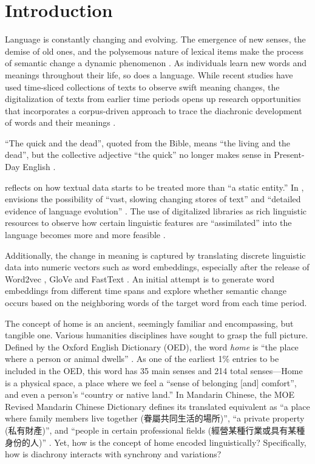 

\chapter{Introduction}
Language is constantly changing and evolving. The emergence of new senses, the demise of old ones, and the polysemous nature of lexical items make the process of semantic change a dynamic phenomenon \parencite{robertinvanhove2008}. As individuals learn new words and meanings throughout their life, so does a language. While recent studies have used time-sliced collections of texts to observe swift meaning changes, the digitalization of texts from earlier time periods opens up research opportunities that incorporates a corpus-driven approach to trace the diachronic development of words and their meanings \parencite{kutuzov2018survey,tahmasebi2018survey,camacho2018survey}.

``The quick and the dead'', quoted from the Bible, means ``the living and the dead'', but the collective adjective ``the quick'' no longer makes sense in Present-Day English \parencite[199]{semanticincrowley2010}.

\textcite{renouf2002time} reflects on how textual data starts to be treated more than ``a static entity.'' In \cite*{sinclair1982reflections}, \citeauthor{sinclair1982reflections} envisions the possibility of ``vast, slowing changing stores of text'' and ``detailed evidence of language evolution'' . The use of digitalized libraries as rich linguistic resources to observe how certain linguistic features are ``assimilated'' into the language becomes more and more feasible \parencite{renouf2002time}.

Additionally, the change in meaning is captured by translating discrete linguistic data into numeric vectors such as word embeddings, especially after the release of Word2vec \parencite{mikolov2013efficient}, GloVe \parencite{pennington2014glove} and FastText \parencite{bojanowski2016enriching}. An initial attempt is to generate word embeddings from different time spans and explore whether semantic change occurs based on the neighboring words of the target word from each time period.

The concept of home is an ancient, seemingly familiar and encompassing, but tangible one. Various humanities disciplines have sought to grasp the full picture. Defined by the Oxford English Dictionary (OED), the word \textit{home} is ``the place where a person or animal dwells'' . As one of the earliest 1\% entries to be included in the OED, this word has 35 main senses and 214 total senses—Home is a physical space, a place where we feel a ``sense of belonging [and] comfort'', and even a person's ``country or native land.'' In Mandarin Chinese, the MOE Revised Mandarin Chinese Dictionary defines its translated equivalent  as ``a place where family members live together (眷屬共同生活的場所)'', ``a private property (私有財產)'', and ``people in certain professional fields (經營某種行業或具有某種身份的人)'' . Yet, how is the concept of home encoded linguistically? Specifically, how is diachrony interacts with synchrony and variations?

